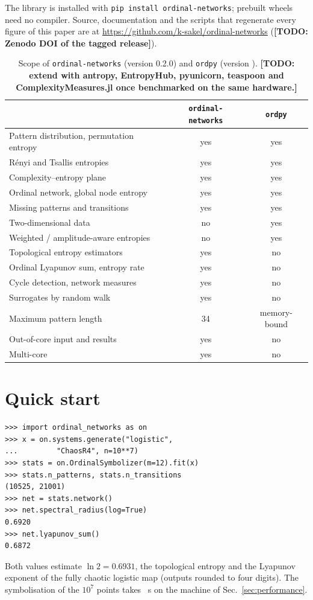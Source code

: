 \documentclass[aip,cha,reprint,amsmath,amssymb]{revtex4-2}
\newcommand{\pkg}{\texttt{ordinal-networks}}
\newcommand{\code}[1]{\texttt{#1}}
\newcommand{\TODO}[1]{\textbf{[TODO: #1]}}
\begin{document}
The library is installed with \code{pip install ordinal-networks}; prebuilt wheels
need no compiler. Source, documentation and the scripts that regenerate every figure
of this paper are at \url{https://github.com/k-sakel/ordinal-networks}
(\TODO{Zenodo DOI of the tagged release}).

\begin{table}
\caption{\label{tab:compare}Scope of \pkg{} (version 0.2.0) and \code{ordpy}
(version \ordpyVersion). \TODO{extend with antropy, EntropyHub, pyunicorn, teaspoon and
ComplexityMeasures.jl once benchmarked on the same hardware.}}
\begin{ruledtabular}
\begin{tabular}{lcc}
 & \pkg{} & \code{ordpy} \\
\hline
Pattern distribution, permutation entropy & yes & yes \\
R\'enyi and Tsallis entropies & yes & yes \\
Complexity--entropy plane & yes & yes \\
Ordinal network, global node entropy & yes & yes \\
Missing patterns and transitions & yes & yes \\
Two-dimensional data & no & yes \\
Weighted / amplitude-aware entropies & no & yes \\
Topological entropy estimators & yes & no \\
Ordinal Lyapunov sum, entropy rate & yes & no \\
Cycle detection, network measures & yes & no \\
Surrogates by random walk & yes & no \\
Maximum pattern length & 34 & memory-bound \\
Out-of-core input and results & yes & no \\
Multi-core & yes & no \\
\end{tabular}
\end{ruledtabular}
\end{table}

\section{Quick start}

\begin{verbatim}
>>> import ordinal_networks as on
>>> x = on.systems.generate("logistic",
...         "ChaosR4", n=10**7)
>>> stats = on.OrdinalSymbolizer(m=12).fit(x)
>>> stats.n_patterns, stats.n_transitions
(10525, 21001)
>>> net = stats.network()
>>> net.spectral_radius(log=True)
0.6920
>>> net.lyapunov_sum()
0.6872
\end{verbatim}
Both values estimate $\ln 2 = 0.6931$, the topological entropy and the Lyapunov
exponent of the fully chaotic logistic map (outputs rounded to four digits). The
symbolisation of the $10^7$ points takes \tQuick~s on the machine of
Sec.~\ref{sec:performance}.
\end{document}
